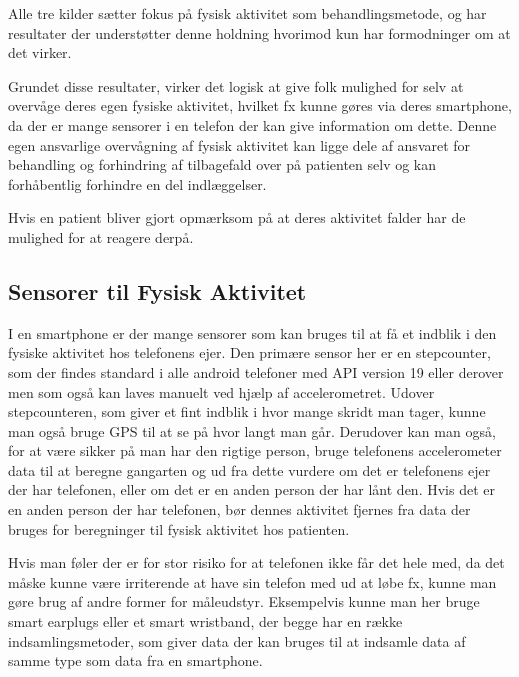 Alle tre kilder sætter fokus på fysisk aktivitet som behandlingsmetode, \citet{art:physMental} og \citet{book:sportPsyc} har resultater der understøtter denne holdning hvorimod \citet{misc:healthReports} kun har formodninger om at det virker.

Grundet disse resultater, virker det logisk at give folk mulighed for selv at overvåge deres egen fysiske aktivitet, hvilket fx kunne gøres via deres smartphone, da der er mange sensorer i en telefon der kan give information om dette.
Denne egen ansvarlige overvågning af fysisk aktivitet kan ligge dele af ansvaret for behandling og forhindring af tilbagefald over på patienten selv og kan forhåbentlig forhindre en del indlæggelser.

Hvis en patient bliver gjort opmærksom på at deres aktivitet falder har de mulighed for at reagere derpå.


\subsection{Sensorer til Fysisk Aktivitet}
I en smartphone er der mange sensorer som kan bruges til at få et indblik i den fysiske aktivitet hos telefonens ejer.
Den primære sensor her er en stepcounter, som der findes standard i alle android telefoner med API version 19 eller derover men som også kan laves manuelt ved hjælp af accelerometret.
Udover stepcounteren, som giver et fint indblik i hvor mange skridt man tager, kunne man også bruge GPS til at se på hvor langt man går.
Derudover kan man også, for at være sikker på man har den rigtige person, bruge telefonens accelerometer data til at beregne gangarten \citep{4272626} og ud fra dette vurdere om det er telefonens ejer der har telefonen, eller om det er en anden person der har lånt den.
Hvis det er en anden person der har telefonen, bør dennes aktivitet fjernes fra data der bruges for beregninger til fysisk aktivitet hos patienten.

Hvis man føler der er for stor risiko for at telefonen ikke får det hele med, da det måske kunne være irriterende at have sin telefon med ud at løbe fx, kunne man gøre brug af andre former for måleudstyr.
Eksempelvis kunne man her bruge smart earplugs eller et smart wristband, der begge har en række indsamlingsmetoder, som giver data der kan bruges til at indsamle data af samme type som data fra en smartphone.